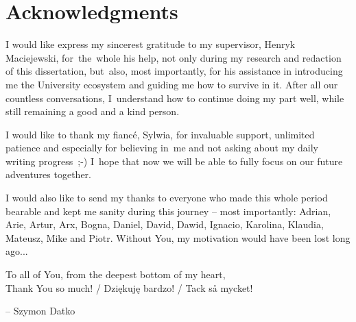 
\chapter*{Acknowledgments}
\label{chapter:acknowledgments}

I would like express my sincerest gratitude to my supervisor, Henryk Maciejewski, for~the~whole his help, not only during my research and redaction of this dissertation, but~also, most importantly, for his assistance in introducing me the University ecosystem and guiding me how to survive in it. After all our countless conversations, I~understand how to continue doing my part well, while still remaining a good and a kind person.

I would like to thank my fiancé, Sylwia, for invaluable support, unlimited patience and especially for believing in~me and not asking about my daily writing progress~;-) I~hope that now we will be able to fully focus on our future adventures together.

I would also like to send my thanks to everyone who made this whole period bearable and kept me sanity during this journey – most importantly: Adrian, Arie, Artur, Arx, Bogna, Daniel, David, Dawid, Ignacio, Karolina, Klaudia, Mateusz, Mike and Piotr. Without You, my motivation would have been lost long ago...

\noindent
To all of You, from the deepest bottom of my heart, \\
Thank You so much! / Dziękuję bardzo! / Tack så mycket!

\hfill – Szymon Datko
